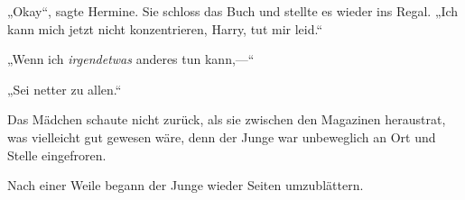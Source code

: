 „Okay“, sagte Hermine. Sie schloss das Buch und stellte es wieder ins Regal.
„Ich kann mich jetzt nicht konzentrieren, Harry, tut mir leid.“

„Wenn ich \emph{irgendetwas} anderes tun kann,—“

„Sei netter zu allen.“

Das Mädchen schaute nicht zurück, als sie zwischen den Magazinen heraustrat, was vielleicht gut gewesen wäre, denn der Junge war unbeweglich an Ort und Stelle eingefroren.

Nach einer Weile begann der Junge wieder Seiten umzublättern.


